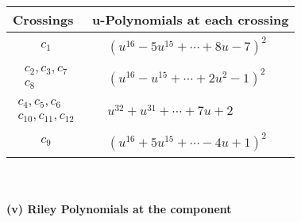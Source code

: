 \documentclass[1p]{elsarticle_modified}
\theoremstyle{definition}
\begin{document}
\begin{tabular}{m{50pt}|m{274pt}}
Crossings & \hspace{64pt}u-Polynomials at each crossing \\
\hline $$\begin{aligned}c_{1}\end{aligned}$$&$\begin{aligned}
&(u^{16}-5 u^{15}+\cdots+8 u-7)^{2}
\end{aligned}$\\
\hline $$\begin{aligned}c_{2},c_{3},c_{7}\\c_{8}\end{aligned}$$&$\begin{aligned}
&(u^{16}- u^{15}+\cdots+2 u^2-1)^{2}
\end{aligned}$\\
\hline $$\begin{aligned}c_{4},c_{5},c_{6}\\c_{10},c_{11},c_{12}\end{aligned}$$&$\begin{aligned}
&u^{32}+u^{31}+\cdots+7 u+2
\end{aligned}$\\
\hline $$\begin{aligned}c_{9}\end{aligned}$$&$\begin{aligned}
&(u^{16}+5 u^{15}+\cdots-4 u+1)^{2}
\end{aligned}$\\
\hline
\end{tabular}\\~\\
\newpage\renewcommand{\arraystretch}{1}
\flushleft \textbf{(v) Riley Polynomials at the component}\newline \\
\end{document}
